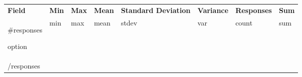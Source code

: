 \renewcommand{\tabularxcolumn}[1]{>{\centering\arraybackslash}m{#1}}
\footnotesize
\begin{xltabular}{\linewidth}{AXXXBCDX}
		\bfseries\color{white} Field &
		\bfseries\color{white} Min &
		\bfseries\color{white} Max &
		\bfseries\color{white} Mean &
		\bfseries\color{white} Standard Deviation &
		\bfseries\color{white} Variance &
		\bfseries\color{white} Responses &
		\bfseries\color{white} Sum \\
	{{#responses}}
	\raggedright{ {{{option}}} } & {{min}} & {{max}} & {{mean}} & {{stdev}} & {{var}} & {{count}} & {{sum}} \\
	{{/responses}}
\end{xltabular}
\normalsize
\tagstructend
